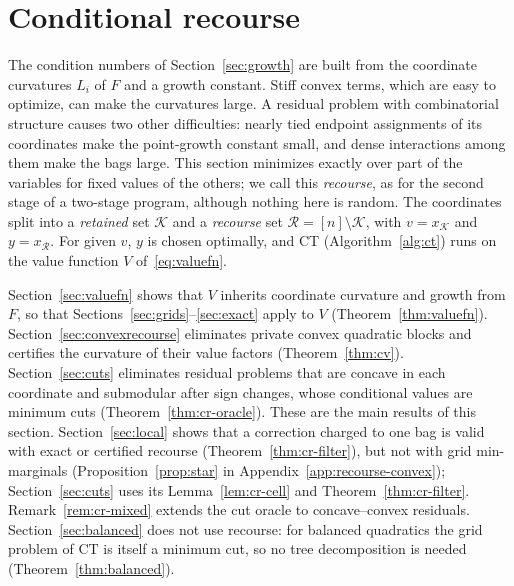 \section{Conditional recourse}\label{sec:recourse}
The condition numbers of Section~\ref{sec:growth} are built from the
coordinate curvatures $L_i$ of $F$ and a growth constant. Stiff convex
terms, which are easy to optimize, can make the curvatures large. A residual
problem with combinatorial structure causes two other difficulties: nearly
tied endpoint assignments of its coordinates make the point-growth constant
small, and dense interactions among them make the bags large. This section
minimizes exactly over part of the variables for fixed values of the others;
we call
this \emph{recourse}, as for the second stage of a two-stage program,
although nothing here is random. The coordinates split into a
\emph{retained} set $\mathcal K$ and a \emph{recourse} set
$\mathcal R=[n]\setminus\mathcal K$, with $v=x_{\mathcal K}$ and
$y=x_{\mathcal R}$. For given $v$, $y$ is chosen optimally, and CT
(Algorithm~\ref{alg:ct}) runs on the value function $V$
of~\eqref{eq:valuefn}.

Section~\ref{sec:valuefn} shows that $V$ inherits coordinate curvature and
growth from $F$, so that Sections~\ref{sec:grids}--\ref{sec:exact} apply to
$V$ (Theorem~\ref{thm:valuefn}). Section~\ref{sec:convexrecourse} eliminates
private convex quadratic blocks and certifies the curvature of their value
factors (Theorem~\ref{thm:cv}). Section~\ref{sec:cuts} eliminates residual
problems that are concave in each coordinate and submodular after sign
changes, whose conditional values are minimum cuts
(Theorem~\ref{thm:cr-oracle}). These are the main results of this section.
Section~\ref{sec:local} shows that a correction charged to one bag is valid
with exact or certified recourse (Theorem~\ref{thm:cr-filter}), but not with
grid min-marginals (Proposition~\ref{prop:star} in
Appendix~\ref{app:recourse-convex}); Section~\ref{sec:cuts} uses its
Lemma~\ref{lem:cr-cell} and Theorem~\ref{thm:cr-filter}.
Remark~\ref{rem:cr-mixed} extends the cut oracle to concave--convex
residuals. Section~\ref{sec:balanced} does not use recourse:
for balanced quadratics the grid problem of CT is itself a minimum cut, so
no tree decomposition is needed (Theorem~\ref{thm:balanced}).







